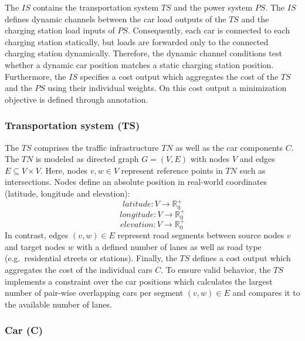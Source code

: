 The $IS$ contains the transportation system $TS$ and the power system $PS$. The $IS$ defines dynamic channels between the car load outputs of the $TS$ and the charging station load inputs of $PS$. Consequently, each car is connected to each charging station statically, but loads are forwarded only to the connected charging station dynamically. Therefore, the dynamic channel conditions test whether a dynamic car position matches a static charging station position. Furthermore, the $IS$ specifies a cost output which aggregates the cost of the $TS$ and the $PS$ using their individual weights. On this cost output a minimization objective is defined through annotation. 

\subsubsection*{Transportation system (TS)}

The $TS$ comprises the traffic infrastructure $TN$ as well as the car components $C$. The $TN$ is modeled as directed graph $G = (V,E)$ with nodes $V$ and edges $E \subseteq V \times V$. Here, nodes $v,w \in V$ represent reference points in $TN$ such as intersections. Nodes define an absolute position in real-world coordinates (latitude, longitude and elevation): 
$$\mathit{latitude}: V \to \mathbb{R}_0^+$$ 
$$\mathit{longitude}: V \to \mathbb{R}_0^+$$ 
$$\mathit{elevation}: V \to \mathbb{R}_0^+$$ 
In contrast, edges $(v,w) \in E$ represent road segments between source nodes $v$ and target nodes $w$ with a defined number of lanes as well as road type (e.g.\ residential streets or stations). Finally, the $TS$ defines a cost output which aggregates the cost of the individual cars $C$. To ensure valid behavior, the $TS$ implements a constraint over the car positions which calculates the largest number of pair-wise overlapping cars per segment $(v,w) \in E$ and compares it to the available number of lanes.

\subsubsection*{Car (C)}
\label{section:car}

